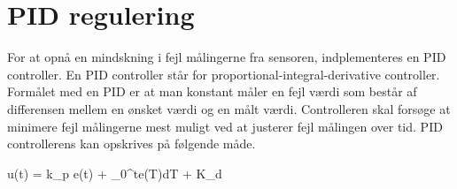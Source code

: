 \section{PID regulering}
For at opnå en mindskning i fejl målingerne fra sensoren, indplementeres en PID controller. En PID controller står for proportional-integral-derivative controller. Formålet med en PID er at man konstant måler en fejl værdi som består af differensen mellem en ønsket værdi og en målt værdi. Controlleren skal forsøge at minimere fejl målingerne mest muligt ved at justerer fejl målingen over tid.\newline
\newline
PID controllerens kan opskrives på følgende måde.

u(t) = k_p e(t) + \int_{0}^{t}e(T)dT + K_d


